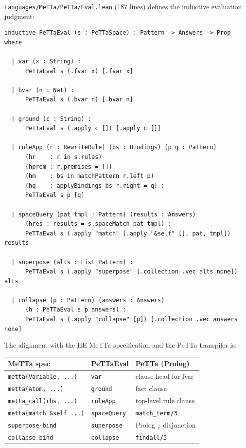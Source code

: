 \documentclass[]{article}
\newcommand{\code}[1]{\texttt{#1}}
\begin{document}
\code{Languages/MeTTa/PeTTa/Eval.lean} (187 lines) defines the inductive evaluation judgment:

\begin{lstlisting}[language=lean]
inductive PeTTaEval (s : PeTTaSpace) : Pattern -> Answers -> Prop where

  | var (x : String) :
      PeTTaEval s (.fvar x) [.fvar x]

  | bvar (n : Nat) :
      PeTTaEval s (.bvar n) [.bvar n]

  | ground (c : String) :
      PeTTaEval s (.apply c []) [.apply c []]

  | ruleApp (r : RewriteRule) (bs : Bindings) (p q : Pattern)
      (hr    : r in s.rules)
      (hprem : r.premises = [])
      (hm    : bs in matchPattern r.left p)
      (hq    : applyBindings bs r.right = q) :
      PeTTaEval s p [q]

  | spaceQuery (pat tmpl : Pattern) (results : Answers)
      (hres : results = s.spaceMatch pat tmpl) :
      PeTTaEval s (.apply "match" [.apply "&self" [], pat, tmpl]) results

  | superpose (alts : List Pattern) :
      PeTTaEval s (.apply "superpose" [.collection .vec alts none]) alts

  | collapse (p : Pattern) (answers : Answers)
      (h : PeTTaEval s p answers) :
      PeTTaEval s (.apply "collapse" [p]) [.collection .vec answers none]
\end{lstlisting}

The alignment with the HE MeTTa specification and the PeTTa transpiler is:

\begin{center}
\begin{tabular}{lll}
\hline
\textbf{MeTTa spec} & \textbf{PeTTaEval} & \textbf{PeTTa (Prolog)} \\
\hline
\code{metta(Variable, ...)} & \code{var} & clause head for fvar \\
\code{metta(Atom, ...)} & \code{ground} & fact clause \\
\code{metta\_call(rhs, ...)} & \code{ruleApp} & top-level rule clause \\
\code{metta(match \&self ...)} & \code{spaceQuery} & \code{match\_term/3} \\
\code{superpose-bind} & \code{superpose} & Prolog \code{;} disjunction \\
\code{collapse-bind} & \code{collapse} & \code{findall/3} \\
\hline
\end{tabular}
\end{center}
\end{document}
